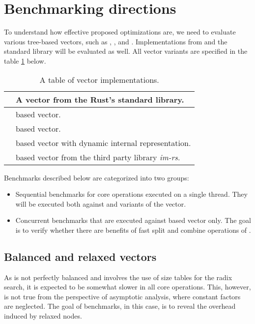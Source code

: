 \section{Benchmarking directions}
To understand how effective proposed optimizations are, we need to evaluate various tree-based vectors, such as \rbvec{}, \rrbvec{}, and \pvec{}. Implementations from \imrsvec{} and the standard library will be evaluated as well. All vector variants are specified in the table \ref{tab:vec-implementations} below. 

\begin{table}
    \centering
    \begin{tabular} { |l| p{11cm} | }
        \hline
        \stdvec{} & A vector from the Rust's standard library. \\ \hline
        \rbvec{} & \rbtree{} based vector. \\ \hline
        \rrbvec{} & \rrbtree{} based vector. \\ \hline
        \pvec{} & \rrbtree{} based vector with dynamic internal representation. \\ \hline
        \imrsvec{} & \rrbtree{} based vector from the third party library \emph{im-rs}\footnotemark{}. \\ \hline
    \end{tabular}
    
    \label{tab:vec-implementations}
    \caption{A table of vector implementations.}
\end{table}


Benchmarks described below are categorized into two groups:
\begin{itemize}
    \item Sequential benchmarks for core operations executed on a single thread. They will be executed both against \rc{} and \arc{} variants of the vector. 
    \item Concurrent benchmarks that are executed against \arc{} based vector only. The goal is to verify whether there are benefits of fast split and combine operations of \rrbvec{}.
\end{itemize}

\subsection{Balanced and relaxed vectors}
As \rrbtree{} is not perfectly balanced and involves the use of size tables for the radix search, it is expected to be somewhat slower in all core operations. This, however, is not true from the perspective of asymptotic analysis, where constant factors are neglected. The goal of benchmarks, in this case, is to reveal the overhead induced by relaxed nodes. 


